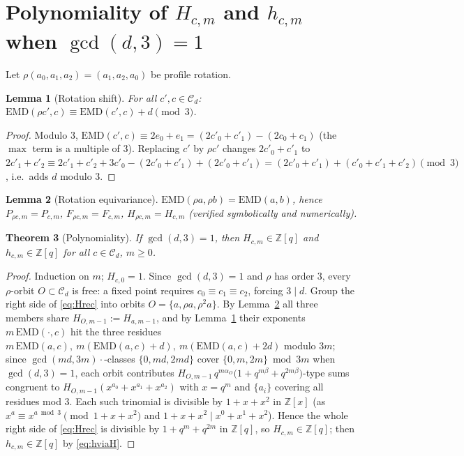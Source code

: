 \documentclass[11pt]{article}
\newtheorem{theorem}{Theorem}
\newtheorem{lemma}[theorem]{Lemma}
\begin{document}
\section{Polynomiality of $H_{c,m}$ and $h_{c,m}$ when $\gcd(d,3)=1$}

Let $\rho(a_0,a_1,a_2)=(a_1,a_2,a_0)$ be profile rotation.

\begin{lemma}[Rotation shift]\label{lem:R}
For all $c',c\in\mathcal{C}_d$:
$\mathrm{EMD}(\rho c',c)\equiv \mathrm{EMD}(c',c)+d \pmod 3$.
\end{lemma}

\begin{proof}
Modulo $3$, $\mathrm{EMD}(c',c)\equiv 2e_0+e_1=(2c'_0+c'_1)-(2c_0+c_1)$
(the $\max$ term is a multiple of $3$). Replacing $c'$ by $\rho c'$ changes
$2c'_0+c'_1$ to $2c'_1+c'_2 \equiv 2c'_1+c'_2+3c'_0 - (2c'_0+c'_1) + (2c'_0+c'_1)
= (2c'_0+c'_1) + (c'_0+c'_1+c'_2) \pmod 3$, i.e.\ adds $d$ modulo $3$.
\end{proof}

\begin{lemma}[Rotation equivariance]\label{lem:I}
$\mathrm{EMD}(\rho a,\rho b)=\mathrm{EMD}(a,b)$, hence $P_{\rho c,m}=P_{c,m}$,
$F_{\rho c,m}=F_{c,m}$, $H_{\rho c,m}=H_{c,m}$ (verified symbolically and numerically).
\end{lemma}

\begin{theorem}[Polynomiality]\label{thm:poly}
If $\gcd(d,3)=1$, then $H_{c,m}\in\mathbb{Z}[q]$ and $h_{c,m}\in\mathbb{Z}[q]$
for all $c\in\mathcal{C}_d$, $m\ge0$.
\end{theorem}

\begin{proof}
Induction on $m$; $H_{c,0}=1$. Since $\gcd(d,3)=1$ and $\rho$ has order $3$, every
$\rho$-orbit $O\subset\mathcal{C}_d$ is free: a fixed point requires $c_0\equiv c_1\equiv c_2$,
forcing $3\mid d$. Group the right side of \eqref{eq:Hrec} into orbits $O=\{a,\rho a,\rho^2 a\}$.
By Lemma~\ref{lem:I} all three members share $H_{O,m-1}:=H_{a,m-1}$, and by Lemma~\ref{lem:R}
their exponents $m\,\mathrm{EMD}(\cdot,c)$ hit the three residues
$m\,\mathrm{EMD}(a,c),\ m(\mathrm{EMD}(a,c)+d),\ m(\mathrm{EMD}(a,c)+2d)$ modulo $3m$;
since $\gcd(md,3m)\cdot$-classes $\{0,md,2md\}$ cover $\{0,m,2m\}\bmod 3m$ when $\gcd(d,3)=1$,
each orbit contributes
$H_{O,m-1}\,q^{m\alpha_O}\bigl(1+q^{m\beta}+q^{2m\beta}\bigr)$-type sums congruent to
$H_{O,m-1}(x^{a_0}+x^{a_1}+x^{a_2})$ with $x=q^m$ and $\{a_i\}$ covering all residues mod $3$.
Each such trinomial is divisible by $1+x+x^2$ in $\mathbb{Z}[x]$
(as $x^{a}\equiv x^{a\bmod 3}\pmod{1+x+x^2}$ and $1+x+x^2\mid x^0+x^1+x^2$).
Hence the whole right side of \eqref{eq:Hrec} is divisible by $1+q^m+q^{2m}$ in
$\mathbb{Z}[q]$, so $H_{c,m}\in\mathbb{Z}[q]$; then $h_{c,m}\in\mathbb{Z}[q]$
by \eqref{eq:hviaH}.
\end{proof}
\end{document}
